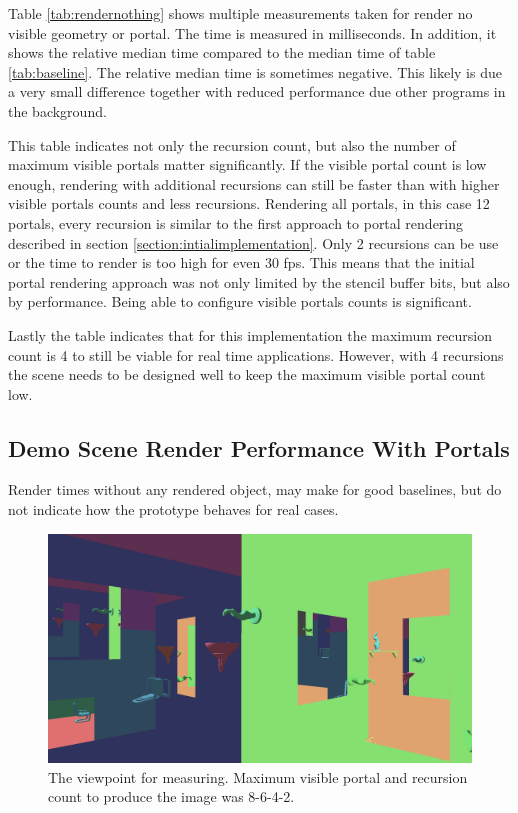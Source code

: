 Table \ref{tab:rendernothing} shows multiple measurements taken for render no visible geometry or portal. The time is measured in milliseconds. In addition, it shows the relative median time compared to the median time of table \ref{tab:baseline}. The relative median time is sometimes negative. This likely is due a very small difference together with reduced performance due other programs in the background.

This table indicates not only the recursion count, but also the number of maximum visible portals matter significantly. If the visible portal count is low enough, rendering with additional recursions can still be faster than with higher visible portals counts and less recursions. Rendering all portals, in this case 12 portals, every recursion is similar to the first approach to portal rendering described in section \ref{section:intialimplementation}. Only 2 recursions can be use or the time to render is too high for even 30 \gls{fps}. This means that the initial portal rendering approach was not only limited by the stencil buffer bits, but also by performance. Being able to configure visible portals counts is significant.

Lastly the table indicates that for this implementation the maximum recursion count is 4 to still be viable for real time applications. However, with 4 recursions the scene needs to be designed well to keep the maximum visible portal count low.






\subsection{Demo Scene Render Performance With Portals}
\label{section:renderperformance}

Render times without any rendered object, may make for good baselines, but do not indicate how the prototype behaves for real cases. 

\begin{figure}[H]
	\includegraphics[width=\linewidth]{images/testsnapshot.png}
	\caption{The  viewpoint for measuring. Maximum visible portal and recursion count to produce the image was 8-6-4-2.}
	\label{fig:perfviewpoint}
\end{figure}

